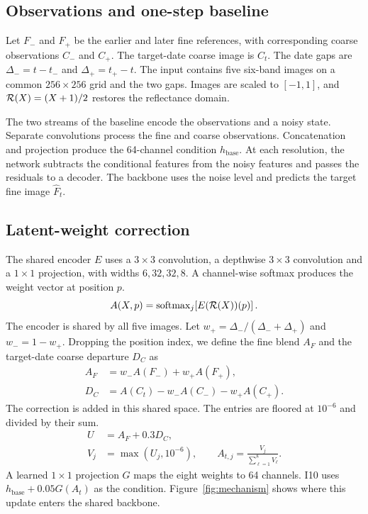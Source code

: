 \documentclass[a4paper,10pt,twocolumn]{article}
\begin{document}
\subsection{Observations and one-step baseline}
Let $F_-$ and $F_+$ be the earlier and later fine references, with corresponding coarse observations $C_-$ and $C_+$. The target-date coarse image is $C_t$. The date gaps are $\Delta_-=t-t_-$ and $\Delta_+=t_+-t$. The input contains five six-band images on a common $256\times256$ grid and the two gaps. Images are scaled to $[-1,1]$, and $\mathcal R(X)=(X+1)/2$ restores the reflectance domain.

The two streams of the baseline encode the observations and a noisy state. Separate convolutions process the fine and coarse observations. Concatenation and projection produce the 64-channel condition $h_{\mathrm{base}}$. At each resolution, the network subtracts the conditional features from the noisy features and passes the residuals to a decoder. The backbone uses the noise level and predicts the target fine image $\widehat F_t$.

\subsection{Latent-weight correction}
The shared encoder $E$ uses a $3\times3$ convolution, a depthwise $3\times3$ convolution and a $1\times1$ projection, with widths $6,32,32,8$. A channel-wise softmax produces the weight vector at position $p$.
\begin{equation}
 A(X,p)=\operatorname{softmax}_{j}\!\left[E(\mathcal R(X))(p)\right].
 \label{eq:weights}
\end{equation}
The encoder is shared by all five images. Let $w_+=\Delta_-/(\Delta_-+\Delta_+)$ and $w_-=1-w_+$. Dropping the position index, we define the fine blend $A_F$ and the target-date coarse departure $D_C$ as
\begin{align}
 A_F &= w_-A(F_-)+w_+A(F_+),\\
 D_C &= A(C_t)-w_-A(C_-)-w_+A(C_+).
 \label{eq:coarse}
\end{align}
The correction is added in this shared space. The entries are floored at $10^{-6}$ and divided by their sum.
\begin{align}
 U&=A_F+0.3D_C,\\
 V_j&=\max(U_j,10^{-6}),\qquad
 A_{t,j}=\frac{V_j}{\sum_{\ell=1}^8 V_\ell}.
 \label{eq:transfer}
\end{align}
A learned $1\times1$ projection $G$ maps the eight weights to 64 channels. I10 uses $h_{\mathrm{base}}+0.05G(A_t)$ as the condition. Figure~\ref{fig:mechanism} shows where this update enters the shared backbone.
\end{document}

